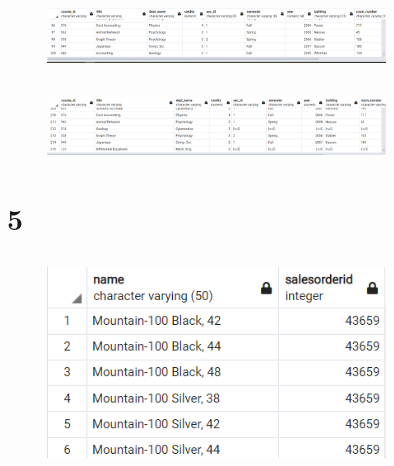 \documentclass{article}
\begin{document}
\subsection{}
\begin{figure}[H]
    \centering
    \includegraphics[width=0.8\textwidth]{figures/4-b.png}
    \caption
	{
	}
    \label{fig:fig1}
\end{figure}

\subsection{}
\begin{figure}[H]
    \centering
    \includegraphics[width=0.8\textwidth]{figures/4-c.png}
    \caption
	{
	}
    \label{fig:fig1}
\end{figure}

\section{5}
\subsection{}
\begin{figure}[H]
    \centering
    \includegraphics[width=0.8\textwidth]{figures/5-a.png}
    \caption
	{
	}
    \label{fig:fig1}
\end{figure}
\end{document}
